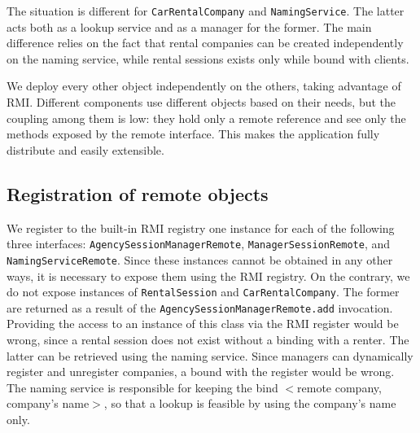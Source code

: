 The situation is different for \texttt{CarRentalCompany} and \texttt{NamingService}. The latter acts both as a lookup service and as a manager for the former. The main difference relies on the fact that rental companies can be created independently on the naming service, while rental sessions exists only while bound with clients. 

We deploy every other object independently on the others, taking advantage of RMI. Different components use different objects based on their needs, but the coupling among them is low: they hold only a remote reference and see only the methods exposed by the remote interface. This makes the application fully distribute and easily extensible. 

\subsection{Registration of remote objects}
We register to the built-in RMI registry one instance for each of the following three interfaces: \texttt{AgencySessionManagerRemote}, \texttt{ManagerSessionRemote}, and \texttt{NamingServiceRemote}. Since these instances cannot be obtained in any other ways, it is necessary to expose them using the RMI registry. On the contrary, we do not expose instances of \texttt{RentalSession} and \texttt{CarRentalCompany}. The former are returned as a result of the \texttt{AgencySessionManagerRemote.add} invocation. Providing the access to an instance of this class via the RMI register would be wrong, since a rental session does not exist without a binding with a renter. The latter can be retrieved using the naming service.
Since managers can dynamically register and unregister companies, a bound with the register would be wrong. The naming service is responsible for keeping the bind $<$remote company, company's name$>$, so that a lookup is feasible by using the company's name only.

